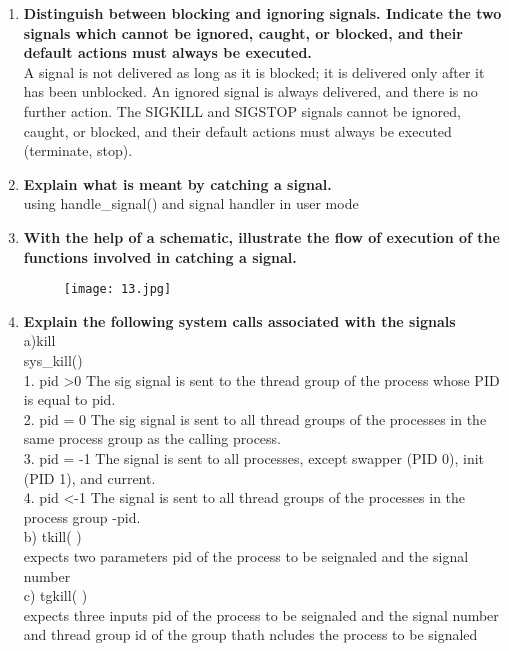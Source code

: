 \documentclass[a4paper,12pt]{article}
\begin{document}
\begin{flushleft}
\begin{enumerate}
{}\\
\item \textbf{ Distinguish between blocking and ignoring signals. Indicate the two signals which cannot be ignored, caught, or blocked, and their default actions must always be executed.}\\
{\color{red}A signal is not delivered as long as it is blocked; it is delivered only after it has been unblocked. 
An ignored signal is always delivered, and there is no further action. 
The SIGKILL and SIGSTOP signals cannot be ignored, caught, or blocked, and their default actions must always be executed (terminate, stop).
}\\
\item \textbf{ Explain what is meant by catching a signal.}\\
{\color{red}using handle\_signal() and signal handler in user mode}\\
\item \textbf{ With the help of a schematic, illustrate the flow of execution of the functions involved in catching a signal.}\\
\begin{figure}[H]
 \centering
  \texttt{[image: 13.jpg]}
  \label{fig:14}
\end{figure}
\item \textbf{ Explain the following system calls associated with the signals}\\
a)kill \\
{\color{red}sys\_kill()\\1. pid \textgreater 0 The sig signal is sent to the thread group of the process whose PID is equal to pid. 
\\2. pid = 0 The sig signal is sent to all thread groups of the processes in the same process group as the calling process. 
\\3. pid = -1 The signal is sent to all processes, except swapper (PID 0), init (PID 1), and current. 
\\4. pid \textless -1 The signal is sent to all thread groups of the processes in the process group -pid.
}\\
b) tkill( ) \\
{\color{red}expects two parameters pid of the process to be seignaled and the signal number}\\
c) tgkill( )\\
{\color{red}expects three inputs  pid of the process to be seignaled and the signal number and thread group id of the group thath ncludes the process to be signaled}\\
\end{enumerate}
\end{flushleft}
\end{document}
